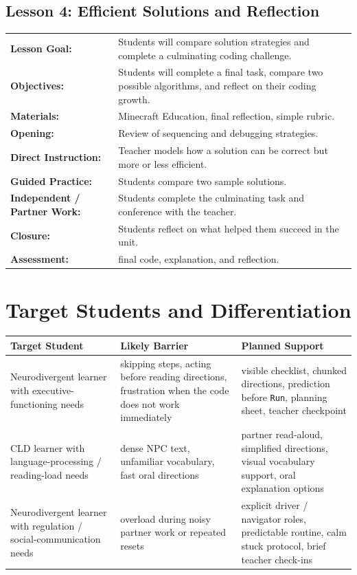 \documentclass[12pt]{article}
\begin{document}
\subsection{Lesson 4: Efficient Solutions and Reflection}

\begin{tabular}{@{}P{1.7in}P{4.3in}@{}}
\textbf{Lesson Goal:} & Students will compare solution strategies and complete a culminating coding challenge. \\
\textbf{Objectives:} & Students will complete a final task, compare two possible algorithms, and reflect on their coding growth. \\
\textbf{Materials:} & Minecraft Education, final reflection, simple rubric. \\
\textbf{Opening:} & Review of sequencing and debugging strategies. \\
\textbf{Direct Instruction:} & Teacher models how a solution can be correct but more or less efficient. \\
\textbf{Guided Practice:} & Students compare two sample solutions. \\
\textbf{Independent / Partner Work:} & Students complete the culminating task and conference with the teacher. \\
\textbf{Closure:} & Students reflect on what helped them succeed in the unit. \\
\textbf{Assessment:} & final code, explanation, and reflection. \\
\end{tabular}

\section{Target Students and Differentiation}

\begin{longtable}{@{}P{1.25in}P{1.75in}P{3.1in}@{}}
\toprule
\textbf{Target Student} & \textbf{Likely Barrier} & \textbf{Planned Support} \\
\midrule
\endhead
Neurodivergent learner with executive-functioning needs & skipping steps, acting before reading directions, frustration when the code does not work immediately & visible checklist, chunked directions, prediction before \texttt{Run}, planning sheet, teacher checkpoint \\
\midrule
CLD learner with language-processing / reading-load needs & dense NPC text, unfamiliar vocabulary, fast oral directions & partner read-aloud, simplified directions, visual vocabulary support, oral explanation options \\
\midrule
Neurodivergent learner with regulation / social-communication needs & overload during noisy partner work or repeated resets & explicit driver / navigator roles, predictable routine, calm stuck protocol, brief teacher check-ins \\
\bottomrule
\end{longtable}
\end{document}
